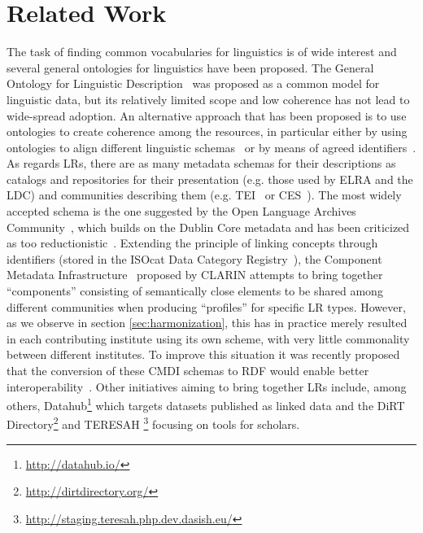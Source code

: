 \documentclass{llncs}
\begin{document}
\section{Related Work}
\label{sec:relatedwork}
The task of finding common vocabularies for linguistics is of wide interest and several general ontologies for linguistics have been proposed. The General Ontology for Linguistic Description~\cite[GOLD]{farrar2002common} was proposed as a common model for linguistic data, but its relatively limited scope and low coherence has not lead to wide-spread adoption. An alternative approach that has been proposed is to use ontologies to create coherence among the resources, in particular either by using ontologies to align different linguistic schemas~\cite{chiarcos2012ontologies} or by means of agreed identifiers~\cite{kemps2008isocat}. 
As regards LRs, there are as many metadata schemas for their descriptions as
catalogs and repositories for their presentation (e.g. those used by ELRA and
the LDC) and communities describing them (e.g. TEI~\cite{ide1995text} or
CES~\cite{ide1998corpus}). The most widely accepted schema is the one  suggested
by the Open Language Archives Community~\cite[OLAC]{bird2001olac}, which builds on
the Dublin Core metadata and has been criticized as too reductionistic~\cite{who}. 
Extending the principle of linking concepts through identifiers (stored in the
ISOcat Data Category Registry~\cite{kemps2008isocat}), the Component Metadata Infrastructure~\cite{broeder2012cmdi} proposed by CLARIN attempts to bring together ``components'' consisting of semantically close elements to be shared among different communities when producing ``profiles'' for specific LR types.
However, as  we observe in section \ref{sec:harmonization}, this has in practice
merely resulted in each contributing institute using its own scheme, with very
little commonality between different institutes. To improve this situation it
was recently proposed that the conversion of these CMDI schemas to RDF would
enable better interoperability~\cite{durco2014clarin}.
Other initiatives aiming to bring together LRs include, among others,
Datahub\footnote{\url{http://datahub.io/}} which targets datasets published as
linked data and the DiRT Directory\footnote{\url{http://dirtdirectory.org/}} and
TERESAH
\footnote{\url{http://staging.teresah.php.dev.dasish.eu/}} focusing on tools for scholars.
\end{document}
